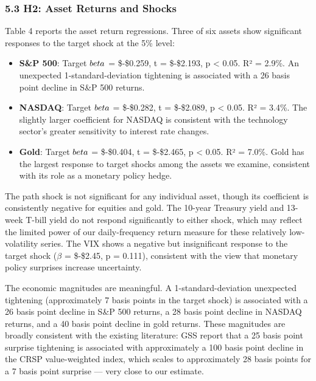 \documentclass[12pt]{article}
\begin{document}
\subsubsection{5.3 H2: Asset Returns and
Shocks}\label{h2-asset-returns-and-shocks}

Table 4 reports the asset return regressions. Three of six assets show
significant responses to the target shock at the 5\% level:

\begin{itemize}
\item
  \textbf{S\&P 500}: Target \(\\beta\) = \$-\$0.259, t = \$-\$2.193, p
  \textless{} 0.05. R² = 2.9\%. An unexpected 1-standard-deviation
  tightening is associated with a 26 basis point decline in S\&P 500
  returns.
\item
  \textbf{NASDAQ}: Target \(\\beta\) = \$-\$0.282, t = \$-\$2.089, p
  \textless{} 0.05. R² = 3.4\%. The slightly larger coefficient for
  NASDAQ is consistent with the technology sector's greater sensitivity
  to interest rate changes.
\item
  \textbf{Gold}: Target \(\\beta\) = \$-\$0.404, t = \$-\$2.465, p
  \textless{} 0.05. R² = 7.0\%. Gold has the largest response to target
  shocks among the assets we examine, consistent with its role as a
  monetary policy hedge.
\end{itemize}

The path shock is not significant for any individual asset, though its
coefficient is consistently negative for equities and gold. The 10-year
Treasury yield and 13-week T-bill yield do not respond significantly to
either shock, which may reflect the limited power of our daily-frequency
return measure for these relatively low-volatility series. The VIX shows
a negative but insignificant response to the target shock (\(\beta\) =
\$-\$2.45, p = 0.111), consistent with the view that monetary policy
surprises increase uncertainty.

The economic magnitudes are meaningful. A 1-standard-deviation
unexpected tightening (approximately 7 basis points in the target shock)
is associated with a 26 basis point decline in S\&P 500 returns, a 28
basis point decline in NASDAQ returns, and a 40 basis point decline in
gold returns. These magnitudes are broadly consistent with the existing
literature: GSS report that a 25 basis point surprise tightening is
associated with approximately a 100 basis point decline in the CRSP
value-weighted index, which scales to approximately 28 basis points for
a 7 basis point surprise --- very close to our estimate.
\end{document}
